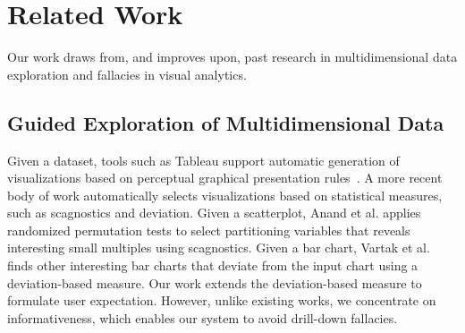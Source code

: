 \section{Related Work}
Our work draws from, and improves upon, past research in multidimensional data exploration and fallacies in visual analytics. 
\subsection{Guided Exploration of Multidimensional Data}
Given a dataset, tools such as Tableau support automatic generation of visualizations based on perceptual graphical presentation rules~\cite{Mackinlay2007,Wongsuphasawat2016}. A more recent body of work automatically selects visualizations based on statistical measures, such as scagnostics and deviation. Given a scatterplot, Anand et al. \cite{Anand2015} applies randomized permutation tests to select partitioning variables that reveals interesting small multiples using scagnostics. Given a bar chart, Vartak et al. \cite{Vartak2015} finds other interesting bar charts that deviate from the input chart using a deviation-based measure. Our work extends the deviation-based measure to formulate user expectation. However, unlike existing works, we concentrate on informativeness, which enables our system to avoid drill-down fallacies.
